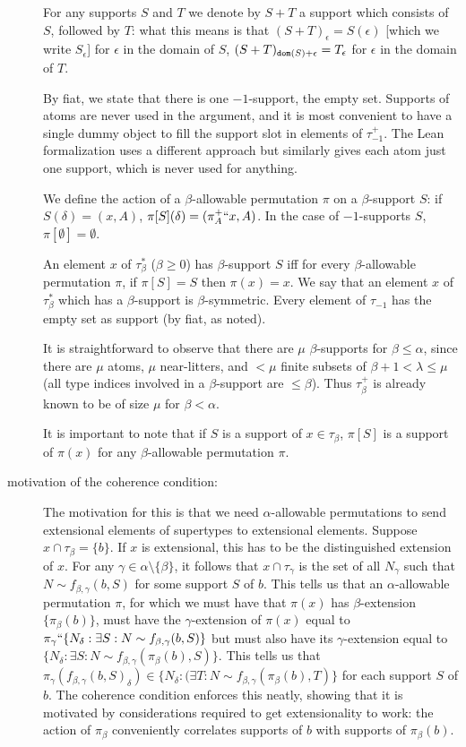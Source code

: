 \documentclass[112pt]{article}
\begin{document}
\begin{description}
For any supports $S$ and $T$ we denote by $S+T$ a support which consists
of $S$, followed by $T$:  what this means is that $(S+T)_\epsilon = S(\epsilon)$ [which we write $S_\epsilon$] for $\epsilon$ in the domain of $S$, $(S+T)_{{\tt dom}(S)+\epsilon} = T_\epsilon$ for $\epsilon$ in the domain of $T$.

By fiat, we state that there is one $-1$-support, the empty set.   Supports of atoms are never used in the argument, and it is most convenient to have a single dummy object to fill the support slot in elements of
$\tau_{-1}^+$.  The Lean formalization uses a different approach but similarly gives each atom just one support, which is never used for anything.

We define the action of a $\beta$-allowable permutation $\pi$ on a $\beta$-support $S$:  if $S(\delta) = (x,A)$, $\pi[S](\delta) = (\pi^+_A``x,A)$.  In the case of $-1$-supports $S$, $\pi[\emptyset]=\emptyset$.   

An element $x$ of $\tau^*_\beta$ ($\beta \geq 0$) has $\beta$-support $S$ iff for every $\beta$-allowable permutation $\pi$, if $\pi[S] = S$ then $\pi(x)=x$.  We say that  an element $x$ of $\tau^*_\beta$ which has a $\beta$-support is $\beta$-symmetric. Every element of $\tau_{-1}$ has the empty set as support (by fiat, as noted).

It is straightforward to observe that there are $\mu$ $\beta$-supports for $\beta\leq \alpha$, since there are $\mu$ atoms, $\mu$ near-litters, and
$<\mu$ finite subsets of $\beta +1<\lambda \leq \mu$ (all type indices involved in a $\beta$-support are $\leq \beta$).  Thus $\tau_\beta^+$ is already known to be of size $\mu$ for $\beta<\alpha$.

It is important to note that if $S$ is a support of $x\in \tau_\beta$, $\pi[S]$ is a support of $\pi(x)$ for any $\beta$-allowable permutation $\pi$.

\item[motivation of the coherence condition:]  The motivation for this is that we need $\alpha$-allowable permutations to send extensional elements of supertypes to extensional elements.  Suppose
$x \cap \tau_\beta = \{b\}$.  If $x$ is extensional, this has to be the distinguished extension of $x$.  For any $\gamma \in \alpha \setminus \{\beta\}$,
it follows that $x \cap \tau_\gamma$ is the set of all $N_\gamma$ such that $N \sim f_{\beta,\gamma}(b,S)$ for some support $S$ of $b$.  This tells us that an $\alpha$-allowable permutation $\pi$, for which we must have that $\pi(x)$ has $\beta$-extension $\{\pi_\beta(b)\}$, must have the  $\gamma$-extension of $\pi(x)$ equal to $\pi_\gamma``\{N_\delta:\exists S:N \sim f_{\beta,\gamma}(b,S)\}$
but must also have its $\gamma$-extension equal to $\{N_\delta:\exists S:N \sim f_{\beta,\gamma}(\pi_\beta(b),S)\}$.  This tells us that $\pi_\gamma(f_{\beta,\gamma}(b,S)_\delta) \in \{N_\delta:(\exists T:N \sim f_{\beta,\gamma}(\pi_\beta(b),T)\}$ for each support $S$ of $b$.  The coherence condition enforces this neatly, showing that it is motivated by considerations required to get extensionality to work: the action of $\pi_\beta$ conveniently correlates supports of $b$ with supports of $\pi_\beta(b)$.


\end{description}
\end{document}

